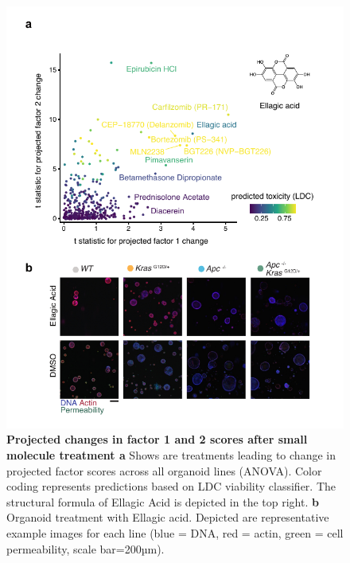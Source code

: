 \begin{flushleft}
\begin{figure}[h]
\centering
\includegraphics[scale=0.75,
                keepaspectratio]{figures/adenomaprofiling/pdf/fig_5_1.pdf}
\caption{\textbf{Projected changes in factor 1 and 2 scores after small molecule treatment a} Shows are treatments leading to change in projected factor scores across all organoid lines (ANOVA). Color coding represents predictions based on LDC viability classifier. The structural formula of Ellagic Acid is depicted in the top right. \textbf{b} Organoid treatment with Ellagic acid. Depicted are representative example images for each line (blue = DNA, red = actin, green = cell permeability, scale bar=200µm).}
\label{fig_310}
\end{figure}
\bigbreak


\end{flushleft}